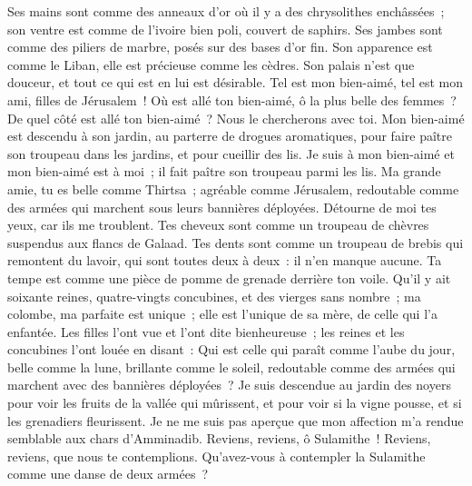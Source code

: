 \begin{multicols}{2}
Ses mains sont comme des anneaux d'or où il y a des chrysolithes enchâssées~; son ventre est comme de l'ivoire bien poli, couvert de saphirs.
Ses jambes sont comme des piliers de marbre, posés sur des bases d'or fin. Son apparence est comme le Liban, elle est précieuse comme les cèdres.
Son palais n'est que douceur, et tout ce qui est en lui est désirable. Tel est mon bien-aimé, tel est mon ami, filles de Jérusalem~!
\VerseOne{} Où est allé ton bien-aimé, ô la plus belle des femmes~? De quel côté est allé ton bien-aimé~? Nous le chercherons avec toi.
 Mon bien-aimé est descendu à son jardin, au parterre de drogues aromatiques, pour faire paître son troupeau dans les jardins, et pour cueillir des lis.
Je suis à mon bien-aimé et mon bien-aimé est à moi~; il fait paître son troupeau parmi les lis.
 Ma grande amie, tu es belle comme Thirtsa~; agréable comme Jérusalem, redoutable comme des armées qui marchent sous leurs bannières déployées.
Détourne de moi tes yeux, car ils me troublent. Tes cheveux sont comme un troupeau de chèvres suspendus aux flancs de Galaad.
Tes dents sont comme un troupeau de brebis qui remontent du lavoir, qui sont toutes deux à deux~: il n'en manque aucune.
Ta tempe est comme une pièce de pomme de grenade derrière ton voile.
Qu'il y ait soixante reines, quatre-vingts concubines, et des vierges sans nombre~;
ma colombe, ma parfaite est unique~; elle est l'unique de sa mère, de celle qui l'a enfantée. Les filles l'ont vue et l'ont dite bienheureuse~; les reines et les concubines l'ont louée en disant~:
Qui est celle qui paraît comme l'aube du jour, belle comme la lune, brillante comme le soleil, redoutable comme des armées qui marchent avec des bannières déployées~?
 Je suis descendue au jardin des noyers pour voir les fruits de la vallée qui mûrissent, et pour voir si la vigne pousse, et si les grenadiers fleurissent.
Je ne me suis pas aperçue que mon affection m'a rendue semblable aux chars d'Amminadib.
\VerseOne{} Reviens, reviens, ô Sulamithe~! Reviens, reviens, que nous te contemplions.  Qu'avez-vous à contempler la Sulamithe comme une danse de deux armées~?

\end{multicols}
